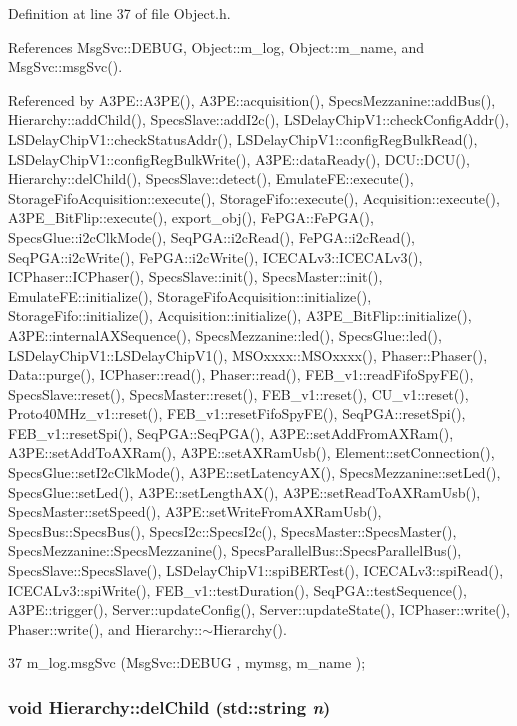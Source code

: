 Definition at line 37 of file Object.h.

References MsgSvc::DEBUG, Object::m\_\-log, Object::m\_\-name, and MsgSvc::msgSvc().

Referenced by A3PE::A3PE(), A3PE::acquisition(), SpecsMezzanine::addBus(), Hierarchy::addChild(), SpecsSlave::addI2c(), LSDelayChipV1::checkConfigAddr(), LSDelayChipV1::checkStatusAddr(), LSDelayChipV1::configRegBulkRead(), LSDelayChipV1::configRegBulkWrite(), A3PE::dataReady(), DCU::DCU(), Hierarchy::delChild(), SpecsSlave::detect(), EmulateFE::execute(), StorageFifoAcquisition::execute(), StorageFifo::execute(), Acquisition::execute(), A3PE\_\-BitFlip::execute(), export\_\-obj(), FePGA::FePGA(), SpecsGlue::i2cClkMode(), SeqPGA::i2cRead(), FePGA::i2cRead(), SeqPGA::i2cWrite(), FePGA::i2cWrite(), ICECALv3::ICECALv3(), ICPhaser::ICPhaser(), SpecsSlave::init(), SpecsMaster::init(), EmulateFE::initialize(), StorageFifoAcquisition::initialize(), StorageFifo::initialize(), Acquisition::initialize(), A3PE\_\-BitFlip::initialize(), A3PE::internalAXSequence(), SpecsMezzanine::led(), SpecsGlue::led(), LSDelayChipV1::LSDelayChipV1(), MSOxxxx::MSOxxxx(), Phaser::Phaser(), Data::purge(), ICPhaser::read(), Phaser::read(), FEB\_\-v1::readFifoSpyFE(), SpecsSlave::reset(), SpecsMaster::reset(), FEB\_\-v1::reset(), CU\_\-v1::reset(), Proto40MHz\_\-v1::reset(), FEB\_\-v1::resetFifoSpyFE(), SeqPGA::resetSpi(), FEB\_\-v1::resetSpi(), SeqPGA::SeqPGA(), A3PE::setAddFromAXRam(), A3PE::setAddToAXRam(), A3PE::setAXRamUsb(), Element::setConnection(), SpecsGlue::setI2cClkMode(), A3PE::setLatencyAX(), SpecsMezzanine::setLed(), SpecsGlue::setLed(), A3PE::setLengthAX(), A3PE::setReadToAXRamUsb(), SpecsMaster::setSpeed(), A3PE::setWriteFromAXRamUsb(), SpecsBus::SpecsBus(), SpecsI2c::SpecsI2c(), SpecsMaster::SpecsMaster(), SpecsMezzanine::SpecsMezzanine(), SpecsParallelBus::SpecsParallelBus(), SpecsSlave::SpecsSlave(), LSDelayChipV1::spiBERTest(), ICECALv3::spiRead(), ICECALv3::spiWrite(), FEB\_\-v1::testDuration(), SeqPGA::testSequence(), A3PE::trigger(), Server::updateConfig(), Server::updateState(), ICPhaser::write(), Phaser::write(), and Hierarchy::$\sim$Hierarchy().


\begin{DoxyCode}
37 { m_log.msgSvc (MsgSvc::DEBUG   , mymsg, m_name ); }
\end{DoxyCode}
\hypertarget{classHierarchy_a1928ac7615fe0b5e55cd707f70dc6781}{
\subsubsection[{delChild}]{\setlength{\rightskip}{0pt plus 5cm}void Hierarchy::delChild (std::string {\em n})}}
\label{classHierarchy_a1928ac7615fe0b5e55cd707f70dc6781}



